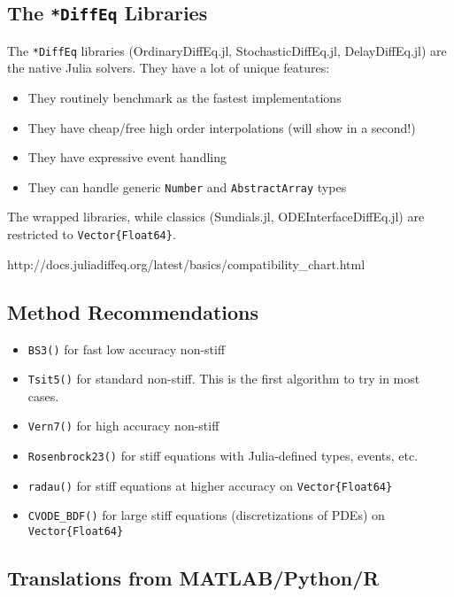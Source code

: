 \documentclass[11pt]{article}
\begin{document}
    \subsection{The \texttt{*DiffEq} Libraries}\label{the-diffeq-libraries}

The \texttt{*DiffEq} libraries (OrdinaryDiffEq.jl, StochasticDiffEq.jl,
DelayDiffEq.jl) are the native Julia solvers. They have a lot of unique
features:

\begin{itemize}
\itemsep1pt\parskip0pt
\item
  They routinely benchmark as the fastest implementations
\item
  They have cheap/free high order interpolations (will show in a
  second!)
\item
  They have expressive event handling
\item
  They can handle generic \texttt{Number} and \texttt{AbstractArray}
  types
\end{itemize}

The wrapped libraries, while classics (Sundials.jl,
ODEInterfaceDiffEq.jl) are restricted to \texttt{Vector\{Float64\}}.

http://docs.juliadiffeq.org/latest/basics/compatibility\_chart.html

    \subsection{Method Recommendations}\label{method-recommendations}

\begin{itemize}
\itemsep1pt\parskip0pt
\item
  \texttt{BS3()} for fast low accuracy non-stiff
\item
  \texttt{Tsit5()} for standard non-stiff. This is the first algorithm
  to try in most cases.
\item
  \texttt{Vern7()} for high accuracy non-stiff
\item
  \texttt{Rosenbrock23()} for stiff equations with Julia-defined types,
  events, etc.
\item
  \texttt{radau()} for stiff equations at higher accuracy on
  \texttt{Vector\{Float64\}}
\item
  \texttt{CVODE\_BDF()} for large stiff equations (discretizations of
  PDEs) on \texttt{Vector\{Float64\}}
\end{itemize}

    \subsection{Translations from
MATLAB/Python/R}\label{translations-from-matlabpythonr}
\end{document}
